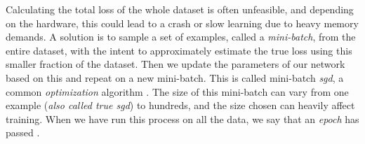     Calculating the total loss of the whole dataset is often unfeasible, and depending on the hardware, this could lead to a crash or slow learning due to
    heavy memory demands. A solution is to sample a set of examples, called a \textit{mini-batch}, from the entire dataset, with the intent to approximately estimate
    the true loss using this smaller fraction of the dataset. Then we update the parameters of our network based on this and repeat on a new mini-batch. This is called mini-batch \textit{\gls{sgd}}, a common \textit{optimization} algorithm \cite{Goodfellow-et-al-2016}. The size of this mini-batch can vary from one example (\textit{also called true \gls{sgd}}) to hundreds, and the size chosen can heavily affect training. When we have run this process on all the data, we say that an \textit{epoch} has passed \cite{wilson2001need_learning_rate}.
    
    
    
    
    
    
    
